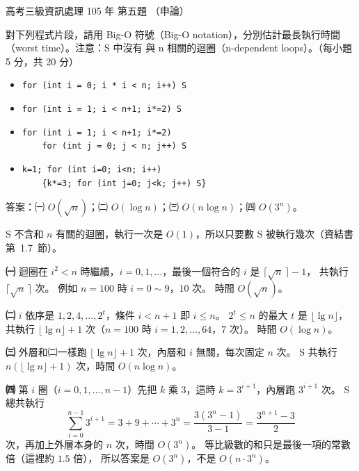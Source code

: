 \begin{pastexam}[label={px:gk3-105-ds-05}]{高考三級資訊處理 105 年 第五題}
（申論）

對下列程式片段，請用 Big-O 符號（Big-O notation），分別估計最長執行時間（worst time）。注意：S 中沒有
與 n 相關的迴圈（n-dependent loops）。（每小題 5 分，共 20 分）
\begin{itemize}[leftmargin=2.2em, nosep]
\item[㈠] \texttt{for (int i = 0; i * i < n; i++) S}
\item[㈡] \texttt{for (int i = 1; i < n+1; i*=2) S}
\item[㈢] \texttt{for (int i = 1; i < n+1; i*=2)}\\
\texttt{\ \ \ \ for (int j = 0; j < n; j++) S}
\item[㈣] \texttt{k=1; for (int i=0; i<n; i++)}\\
\texttt{\ \ \ \ \{k*=3; for (int j=0; j<k; j++) S\}}
\end{itemize}
\end{pastexam}

\begin{pastsoln}
答案：㈠ $O(\sqrt{n})$；㈡ $O(\log n)$；㈢ $O(n \log n)$；㈣ $O(3^n)$。

S 不含和 $n$ 有關的迴圈，執行一次是 $O(1)$，所以只要數 S 被執行幾次（資結書第~1.7~節）。

\textbf{㈠} 迴圈在 $i^2 < n$ 時繼續，$i = 0, 1, \ldots$，最後一個符合的 $i$ 是 $\lceil \sqrt{n}\, \rceil - 1$，
共執行 $\lceil \sqrt{n}\, \rceil$ 次。 例如 $n = 100$ 時 $i = 0 \sim 9$，$10$ 次。 時間 $O(\sqrt{n})$。

\textbf{㈡} $i$ 依序是 $1, 2, 4, \ldots, 2^t$，條件 $i < n + 1$ 即 $i \le n$。 $2^t \le n$ 的最大 $t$ 是
$\lfloor \lg n \rfloor$，共執行 $\lfloor \lg n \rfloor + 1$ 次（$n = 100$ 時 $i = 1, 2, \ldots, 64$，$7$ 次）。
時間 $O(\log n)$。

\textbf{㈢} 外層和㈡一樣跑 $\lfloor \lg n \rfloor + 1$ 次，內層和 $i$ 無關，每次固定 $n$ 次。 S 共執行
$n(\lfloor \lg n \rfloor + 1)$ 次，時間 $O(n \log n)$。

\textbf{㈣} 第 $i$ 圈（$i = 0, 1, \ldots, n - 1$）先把 $k$ 乘 $3$，這時 $k = 3^{i+1}$，內層跑 $3^{i+1}$ 次。
S 總共執行
\[
\sum_{i=0}^{n-1} 3^{i+1} = 3 + 9 + \cdots + 3^n = \frac{3(3^n - 1)}{3 - 1} = \frac{3^{n+1} - 3}{2}
\]
次，再加上外層本身的 $n$ 次，時間 $O(3^n)$。 等比級數的和只是最後一項的常數倍（這裡約 $1.5$ 倍），
所以答案是 $O(3^n)$，不是 $O(n \cdot 3^n)$。
\end{pastsoln}
